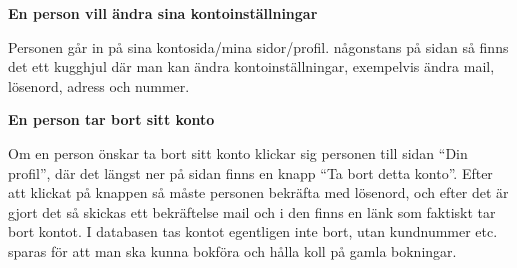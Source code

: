 \documentclass[11pt, titlepage, oneside, a4paper]{article}	%
\begin{document}
\textbf {En person vill ändra sina kontoinställningar}

Personen går in på sina kontosida/mina sidor/profil. någonstans på sidan så finns det ett kugghjul där man kan ändra kontoinställningar, exempelvis ändra mail, lösenord, adress och nummer.

\textbf {En person tar bort sitt konto }

Om en person önskar ta bort sitt konto klickar sig personen till sidan “Din profil”, där det längst ner på sidan finns en knapp “Ta bort detta konto”. Efter att klickat på knappen så måste personen bekräfta med lösenord, och efter det är gjort det så skickas ett bekräftelse mail och i den finns en länk som faktiskt tar bort kontot. I databasen tas kontot egentligen inte bort, utan kundnummer etc. sparas för att man ska kunna bokföra och hålla koll på gamla bokningar.



 


\newpage
\appendix
\end{document}
